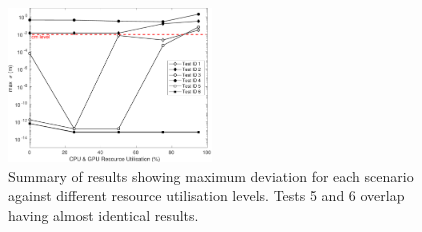 \documentclass[letterpaper, 10 pt, journal, twoside]{IEEEtran}
\begin{document}
\begin{figure}[!t]
    \centering
    \includegraphics[width=0.48\textwidth]{Other/Figures/ExperimentsStressSummaryV3.pdf}
    \caption{Summary of results showing maximum deviation for each scenario against different resource utilisation levels. Tests 5 and 6 overlap having almost identical results.}
    \label{ExperimentsStressSummary}
\end{figure}





\end{document}
